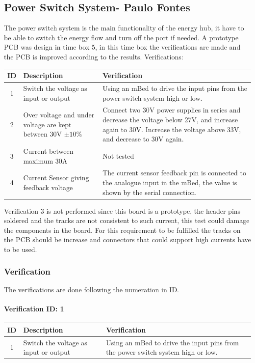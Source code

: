 \subsection{Power Switch System- Paulo Fontes}
The power switch system is the main functionality of the energy hub, it have to be able to switch the energy flow and turn off the port if needed. A prototype PCB was design in time box 5, in this time box the verifications are made and the PCB is improved according to the results.
\p
Verifications:
\begin{table}[H]
\centering
	\begin{tabular}{| c | l | p{7cm} | }
		\hline
		ID & Description & Verification \\\hline
		1 & Switch the voltage as input or output & Using an mBed to drive the input pins from the power switch system high or low. \\\hline
		2 & Over voltage and under voltage are kept between 30V $ \pm10\% $ & Connect two 30V power supplies in series and decrease the voltage below 27V, and increase again to 30V. Increase the voltage above 33V, and decrease to 30V again. \\\hline
		3 & Current between maximum 30A & Not tested \\\hline
		4 & Current Sensor giving feedback voltage & The current sensor feedback pin is connected to the analogue input in the mBed, the value is shown by the serial connection. \\\hline
	\end{tabular}
\end{table}

Verification 3 is not performed since this board is a prototype, the header pins soldered and the tracks are not consistent to such current, this test could damage the components in the board. For this requirement to be fulfilled the tracks on the PCB should be increase and connectors that could support high currents have to be used.

\subsubsection{Verification}
The verifications are done following the numeration in ID.

\paragraph{Verification ID: 1}
\begin{table}[H]
\centering
	\begin{tabular}{| c | l | p{7cm} | }
		\hline
		ID & Description & Verification \\\hline
		1 & Switch the voltage as input or output & Using an mBed to drive the input pins from the power switch system high or low. \\\hline
	\end{tabular}
\end{table}

